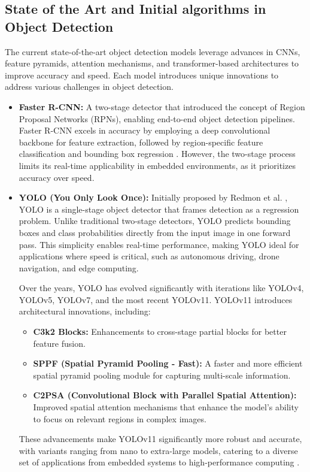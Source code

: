 \documentclass[conference]{IEEEtran}
\begin{document}
\subsection{State of the Art and Initial algorithms in Object Detection}
The current state-of-the-art object detection models leverage advances in CNNs, feature pyramids, attention mechanisms, and transformer-based architectures to improve accuracy and speed. Each model introduces unique innovations to address various challenges in object detection.

\begin{itemize}
    \item \textbf{Faster R-CNN:} A two-stage detector that introduced the concept of Region Proposal Networks (RPNs), enabling end-to-end object detection pipelines. Faster R-CNN excels in accuracy by employing a deep convolutional backbone for feature extraction, followed by region-specific feature classification and bounding box regression \cite{ren2015faster}. However, the two-stage process limits its real-time applicability in embedded environments, as it prioritizes accuracy over speed.
    
    \item \textbf{YOLO (You Only Look Once):} Initially proposed by Redmon et al. \cite{redmon2016yolo}, YOLO is a single-stage object detector that frames detection as a regression problem. Unlike traditional two-stage detectors, YOLO predicts bounding boxes and class probabilities directly from the input image in one forward pass. This simplicity enables real-time performance, making YOLO ideal for applications where speed is critical, such as autonomous driving, drone navigation, and edge computing.

    Over the years, YOLO has evolved significantly with iterations like YOLOv4, YOLOv5, YOLOv7, and the most recent YOLOv11. YOLOv11 introduces architectural innovations, including:
    \begin{itemize}
        \item \textbf{C3k2 Blocks:} Enhancements to cross-stage partial blocks for better feature fusion.
        \item \textbf{SPPF (Spatial Pyramid Pooling - Fast):} A faster and more efficient spatial pyramid pooling module for capturing multi-scale information.
        \item \textbf{C2PSA (Convolutional Block with Parallel Spatial Attention):} Improved spatial attention mechanisms that enhance the model’s ability to focus on relevant regions in complex images.
    \end{itemize}
    These advancements make YOLOv11 significantly more robust and accurate, with variants ranging from nano to extra-large models, catering to a diverse set of applications from embedded systems to high-performance computing \cite{khanam2024yolov11}.
    

\end{itemize}
\end{document}

